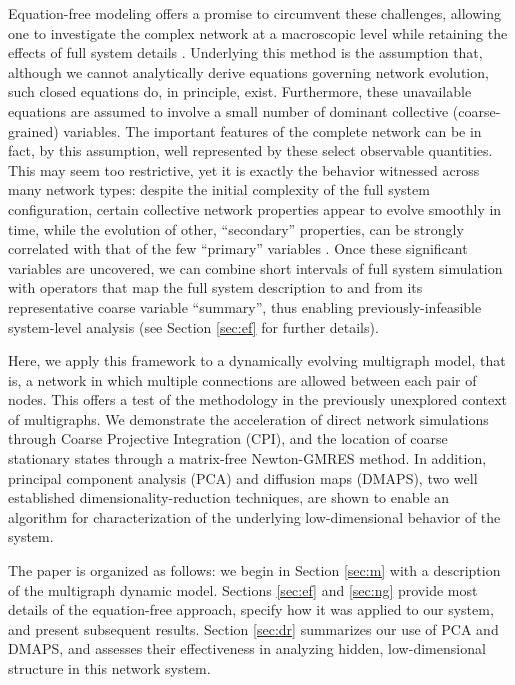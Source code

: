 Equation-free modeling offers a promise to circumvent these
challenges, allowing one to investigate the complex network at a
macroscopic level while retaining the effects of full system details
\cite{kevrekidis_equation-free:_2004,gear_equation-free_2003}.
%
Underlying this method is the assumption that, although we cannot
analytically derive equations governing network evolution, such closed
equations do, in principle, exist.
%
Furthermore, these unavailable equations are assumed to involve a
small number of dominant collective (coarse-grained) variables.
%
The important features of the complete network can be in fact, by this
assumption, well represented by these select observable quantities.
%
This may seem too restrictive, yet it is exactly the behavior
witnessed across many network types: despite the initial complexity of
the full system configuration, certain collective network properties
appear to evolve smoothly in time, while the evolution of other,
``secondary'' properties, can be strongly correlated with that of the
few ``primary'' variables
\cite{bold_equation-free_2014,rajendran_coarse_2011,siettos_equation-free_2011}.
%
Once these significant variables are uncovered, we can combine short
intervals of full system simulation with operators that map the full
system description to and from its representative coarse variable
``summary'', thus enabling previously-infeasible system-level analysis
(see Section \ref{sec:ef} for further details). \par

Here, we apply this framework to a dynamically evolving multigraph
model, that is, a network in which multiple connections are allowed
between each pair of nodes.
%
This offers a test of the methodology in the previously unexplored
context of multigraphs.
%
We demonstrate the acceleration of direct network simulations through
Coarse Projective Integration (CPI), and the location of coarse
stationary states through a matrix-free Newton-GMRES method.
%
In addition, principal component analysis (PCA) and diffusion maps
(DMAPS), two well established dimensionality-reduction techniques, are
shown to enable an algorithm for characterization of the underlying
low-dimensional behavior of the system. \par

The paper is organized as follows: we begin in Section \ref{sec:m}
with a description of the multigraph dynamic model.
%
Sections \ref{sec:ef} and \ref{sec:ng} provide most details of the
equation-free approach, specify how it was applied to our system, and
present subsequent results.
%
Section \ref{sec:dr} summarizes our use of PCA and DMAPS, and assesses
their effectiveness in analyzing hidden, low-dimensional structure in
this network system.

